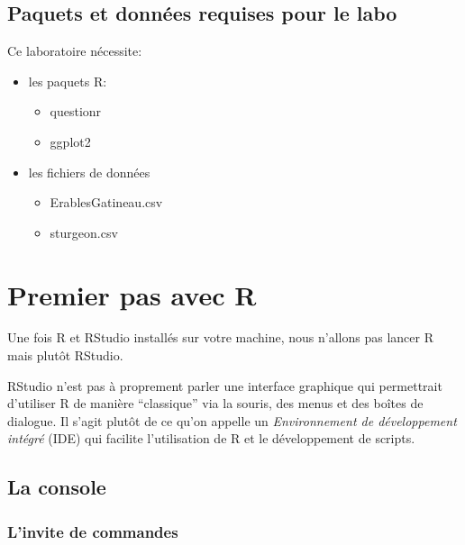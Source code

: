 \documentclass[12pt,]{book}
\providecommand{\tightlist}{%
  \setlength{\itemsep}{0pt}\setlength{\parskip}{0pt}}
\begin{document}
\hypertarget{set-intro}{%
\subsection{Paquets et données requises pour le labo}\label{set-intro}}

Ce laboratoire nécessite:

\begin{itemize}
\tightlist
\item
  les paquets R:

  \begin{itemize}
  \tightlist
  \item
    questionr
  \item
    ggplot2
  \end{itemize}
\item
  les fichiers de données

  \begin{itemize}
  \tightlist
  \item
    ErablesGatineau.csv
  \item
    sturgeon.csv
  \end{itemize}
\end{itemize}

\hypertarget{premier-pas-avec-r}{%
\section{Premier pas avec R}\label{premier-pas-avec-r}}

Une fois R et RStudio installés sur votre machine, nous n'allons pas lancer R mais plutôt RStudio.

RStudio n'est pas à proprement parler une interface graphique qui permettrait d'utiliser R de manière ``classique'' via la souris, des menus et des boîtes de dialogue. Il s'agit plutôt de ce qu'on appelle un \emph{Environnement de développement intégré} (IDE) qui facilite l'utilisation de R et le développement de scripts.

\hypertarget{la-console}{%
\subsection{La console}\label{la-console}}

\hypertarget{linvite-de-commandes}{%
\subsubsection{L'invite de commandes}\label{linvite-de-commandes}}
\end{document}
